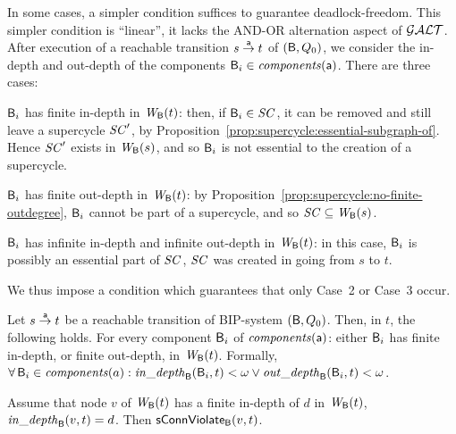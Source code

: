 In some cases, a simpler condition suffices to guarantee deadlock-freedom. This simpler condition is ``linear'', \ie it lacks the AND-OR alternation
aspect of $\GAO$. After execution of a reachable transition $s \la{\act} t$ of $(\B, Q_0)$, 
we consider the in-depth and out-depth of the components $\B_i \in \cmps{\act}$. There are three cases:
%
\bdn

\item[Case 1] \label{case:finite-in}
$\B_i$ has finite in-depth in $\wfg{\B}{t}$: then, if $\B_i \in
\SC$, it can be removed and still leave a supercycle $\SC'$, by
Proposition~\ref{prop:supercycle:essential-subgraph-of}. Hence 
$\SC'$ exists in $\wfg{\B}{s}$, and so 
$\B_i$ is not essential to the creation of a supercycle.

\item[Case 2] \label{case:finite-out}
$\B_i$ has finite out-depth in $\wfg{\B}{t}$: 
by Proposition~\ref{prop:supercycle:no-finite-outdegree}, 
$\B_i$ cannot be part of a supercycle, and so $\SC \sub \wfg{\B}{s}$.

\item[Case 3] \label{case:infinite-both}
$\B_i$ has infinite in-depth and infinite out-depth in
$\wfg{\B}{t}$: in this case, $\B_i$ is possibly an essential part of
$\SC$, \ie $\SC$ was created in going from $s$ to $t$.

\edn
We thus impose a condition which guarantees that only 
Case~2 %
or Case~3 %
occur. 



\bd[$\GLin(\act)$] \label{def:global:dfc}
Let $s \goesto[\act] t$ be a reachable transition of BIP-system $(\B, Q_0)$.
Then, in $t$, the following holds. 
For every component $\B_i$ of $\cmps{\act}$:  either $\B_i$ has finite in-depth,
or finite out-depth, in $\wfg{\B}{t}$.
Formally,\\
\ind  $\fa \B_i \in \cmps{a}: \widepth{\B}{\B_i}{t} < \omega \lor \wodepth{\B}{\B_i}{t} < \omega$.
\ed



\bp \label{prop:indepth-finite-implies-scViol}
Assume that node $v$ of $\wfg{\B}{t}$ has a finite in-depth of $d$ in $\wfg{\B}{t}$, \ie 
$\widepth{\B}{v}{t} = d$. Then $\connViol{v}{t}$.
\ep
%


